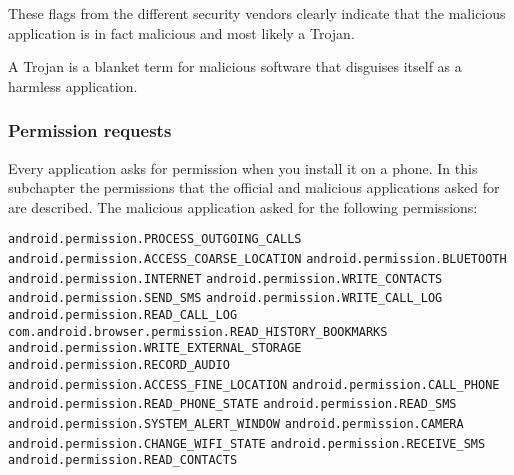 These flags from the different security vendors clearly indicate that the malicious application is in fact malicious and most likely a Trojan.

A Trojan is a blanket term for malicious software that disguises itself as a harmless application.
\newpage
\subsubsection{Permission requests}
Every application asks for permission when you install it on a phone.
In this subchapter the permissions that the official and malicious applications asked for are described.
The malicious application asked for the following permissions:

\texttt{android.permission.PROCESS\_OUTGOING\_CALLS}
\newline \texttt{android.permission.ACCESS\_COARSE\_LOCATION}
\newline \texttt{android.permission.BLUETOOTH}
\newline \texttt{android.permission.INTERNET}
\newline \texttt{android.permission.WRITE\_CONTACTS}
\newline \texttt{android.permission.SEND\_SMS}
\newline \texttt{android.permission.WRITE\_CALL\_LOG}
\newline \texttt{android.permission.READ\_CALL\_LOG}
\newline \texttt{com.android.browser.permission.READ\_HISTORY\_BOOKMARKS}
\newline \texttt{android.permission.WRITE\_EXTERNAL\_STORAGE}
\newline \texttt{android.permission.RECORD\_AUDIO}
\newline \texttt{android.permission.ACCESS\_FINE\_LOCATION}
\newline \texttt{android.permission.CALL\_PHONE}
\newline \texttt{android.permission.READ\_PHONE\_STATE}
\newline \texttt{android.permission.READ\_SMS}
\newline \texttt{android.permission.SYSTEM\_ALERT\_WINDOW}
\newline \texttt{android.permission.CAMERA}
\newline \texttt{android.permission.CHANGE\_WIFI\_STATE}
\newline \texttt{android.permission.RECEIVE\_SMS}
\newline \texttt{android.permission.READ\_CONTACTS}
